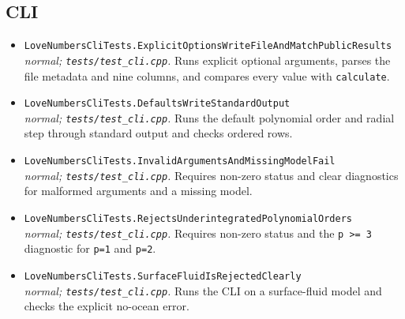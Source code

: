 \subsection*{CLI}
\begin{itemize}[leftmargin=1.4em,itemsep=0.35em]
\item {\footnotesize\texttt{LoveNumbersCliTests.ExplicitOptionsWriteFileAndMatchPublicResults}}\\
\emph{normal; \texttt{tests/test\_cli.cpp}.} Runs explicit optional arguments, parses the file metadata and nine columns, and compares every value with \texttt{calculate}.
\item {\footnotesize\texttt{LoveNumbersCliTests.DefaultsWriteStandardOutput}}\\
\emph{normal; \texttt{tests/test\_cli.cpp}.} Runs the default polynomial order and radial step through standard output and checks ordered rows.
\item {\footnotesize\texttt{LoveNumbersCliTests.InvalidArgumentsAndMissingModelFail}}\\
\emph{normal; \texttt{tests/test\_cli.cpp}.} Requires non-zero status and clear diagnostics for malformed arguments and a missing model.
\item {\footnotesize\texttt{LoveNumbersCliTests.RejectsUnderintegratedPolynomialOrders}}\\
\emph{normal; \texttt{tests/test\_cli.cpp}.} Requires non-zero status and the \texttt{p >= 3} diagnostic for \texttt{p=1} and \texttt{p=2}.
\item {\footnotesize\texttt{LoveNumbersCliTests.SurfaceFluidIsRejectedClearly}}\\
\emph{normal; \texttt{tests/test\_cli.cpp}.} Runs the CLI on a surface-fluid model and checks the explicit no-ocean error.
\end{itemize}
